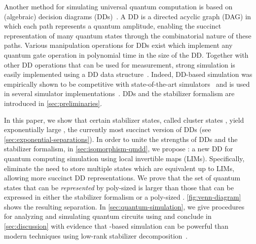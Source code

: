Another method for simulating universal quantum computation is based on (algebraic) decision diagrams (DDs)~\cite{akers1978binary,bryant86,580054,bryant1995verification,sanner,10.1145/157485.164569,fujita1997multi,viamontes2003improving,viamontes2004high,miller2006qmdd,zulehner2018advanced}.
A DD is a directed acyclic graph (DAG) in which each path represents a quantum amplitude, enabling the succinct representation of many quantum states through the combinatorial nature of these paths.
Various manipulation operations for DDs exist which implement any quantum gate operation in polynomial time
in the size of the DD. Together with other DD operations that can be used for measurement,
strong simulation is easily implemented using a DD data structure~\cite{miller2006qmdd,zulehner2018advanced}.
Indeed, DD-based simulation was empirically shown to be competitive with state-of-the-art simulators~\cite{viamontes2004high,zulehner2018advanced} and is used in several simulator implementations~\cite{viamontes2009quantum}.
DDs and the stabilizer formalism are introduced in \autoref{sec:preliminaries}.


In this paper, we show that certain stabilizer states, called cluster states \cite{briegel2000persistent}, yield exponentially large \qmdds, the currently most succinct version of DDs
(see \autoref{sec:exponential-separations}).
In order to unite the strengths of DDs and the stabilizer formalism,
in \autoref{sec:isomorphism-qmdd}, we propose \limdd: a new DD for quantum computing simulation using local invertible maps (LIMs).
Specifically, \limdds eliminate the need to store multiple states which are equivalent up to LIMs, allowing more succinct DD representations.
We prove that the set of quantum states that can be \emph{represented} by poly-sized \limdds 
is larger than those that can be expressed in either the stabilizer formalism or a poly-sized \qmdd.
\autoref{fig:venn-diagram} shows the resulting separation.
In \autoref{sec:quantum-simulation}, we give procedures for analyzing and simulating quantum 
circuits using \limdds and conclude in \autoref{sec:discussion} with evidence that \limdd-based simulation can be powerful than modern techniques using low-rank stabilizer decomposition~\cite{bravyi2019simulation}.

